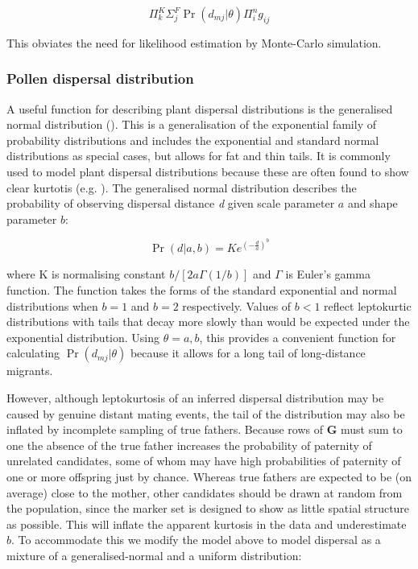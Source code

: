 \documentclass[10pt, a4paper, twocolumn]{article} %
\begin{document}
\begin{equation}
\label{lik_if_no_structure}
\Pi_k^K\Sigma_j^F\Pr(d_{mj} | \theta)\Pi_i^n g_{ij}
\end{equation}

This obviates the need for likelihood estimation by Monte-Carlo simulation.

\subsubsection{Pollen dispersal distribution}

A useful function for describing plant dispersal distributions is the generalised normal distribution (\cite{clark1998trees,Nadarajah2005,kremer2012long}). This is a generalisation of the exponential family of probability distributions and includes the exponential and standard normal distributions as special cases, but allows for fat and thin tails. It is commonly used to model plant dispersal distributions because these are often found to show clear kurtotis (e.g. \cite{austerlitz2004using, robledo2005patterns, klein2008pollen, burczyk2019patterns, field2011importance, ottewell2012pollen}). The generalised normal distribution describes the probability of observing dispersal distance \textit{d} given scale parameter $a$ and shape parameter $b$:

\begin{equation}
\Pr(d|a,b) =K e^{  (-\frac{d}{a} )^b }
\label{eqn:GND}
\end{equation}

where K is normalising constant $b/[2a\Gamma(1/b)]$ and $\Gamma$ is Euler's gamma function. The function takes the forms of the standard exponential and normal distributions when $b=1$ and $b=2$ respectively. Values of $b<1$ reflect leptokurtic distributions with tails that decay more slowly than would be expected under the exponential distribution. Using $\theta={a,b}$, this provides a convenient function for calculating $\Pr(d_{mj} | \theta)$ because it allows for a long tail of long-distance migrants.

However, although leptokurtosis of an inferred dispersal distribution may be caused by genuine distant mating events, the tail of the distribution may also be inflated by incomplete sampling of true fathers. Because rows of \textbf{G} must sum to one the absence of the true father increases the probability of paternity of unrelated candidates, some of whom may have high probabilities of paternity of one or more offspring just by chance. Whereas true fathers are expected to be (on average) close to the mother, other candidates should be drawn at random from the population, since the marker set is designed to show as little spatial structure as possible. This will inflate the apparent kurtosis in the data and underestimate $b$. To accommodate this we modify the model above to model dispersal as a mixture of a generalised-normal and a uniform distribution:
\end{document}
